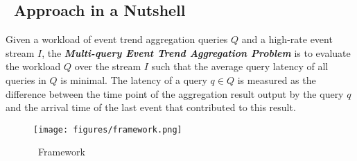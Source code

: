 \subsection{\app\ Approach in a Nutshell}
\label{sec:overview}

Given a workload of event trend aggregation queries $Q$ and a high-rate event stream $I$, the \textbf{\textit{Multi-query Event Trend Aggregation Problem}} is to evaluate the workload $Q$ over the stream $I$ such that the average query latency of all queries in $Q$ is minimal. The latency of a query $q \in Q$ is measured as the difference between the time point of the aggregation result output by the query $q$ and the arrival time of the last event that contributed to this result.

\begin{figure}[!ht]
\centering
\texttt{[image: figures/framework.png]}
\vspace{-5pt}
\caption{\app\ Framework}
\label{fig:framework}
\end{figure}


